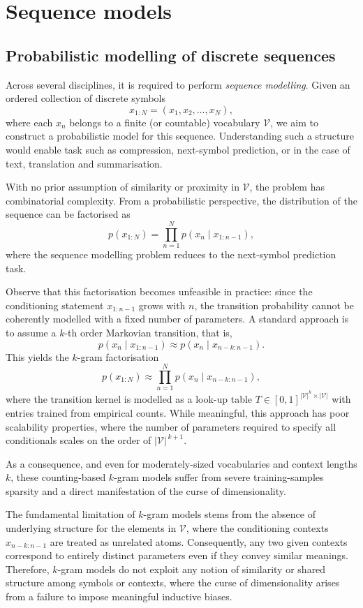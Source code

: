 \chapter{Sequence models}



\section{Probabilistic modelling of discrete sequences}
Across several disciplines, it is required to perform \emph{sequence modelling}. Given an ordered collection of discrete symbols
\[
x_{1:N} = (x_1, x_2, \dots, x_N),
\]
where each $x_n$ belongs to a finite (or countable) vocabulary $\mathcal{V}$, we aim to construct a probabilistic model for this sequence. Understanding such a structure would enable task such as compression, next-symbol prediction, or in the case of text, translation and summarisation. 

With no prior assumption of similarity or proximity in  $\mathcal{V}$, the problem has combinatorial complexity. From a probabilistic perspective, the distribution of the sequence can be factorised as
\[
p(x_{1:N}) = \prod_{n=1}^{N} p(x_n \mid x_{1:n-1}),
\]
where the sequence modelling problem reduces to the next-symbol prediction task.

Observe that this factorisation becomes unfeasible in practice: since the conditioning statement $x_{1:n-1}$ grows with $n$, the transition probability cannot be coherently modelled with a fixed number of parameters. A standard approach is to assume a $k$-th order Markovian transition, that is,
\[
p(x_n \mid x_{1:n-1}) \approx p(x_n \mid x_{n-k:n-1}).
\]
This yields the $k$-gram factorisation
\[
p(x_{1:N}) \approx \prod_{n=1}^{N} p(x_n \mid x_{n-k:n-1}),
\]
where the transition kernel is modelled as a look-up table $T\in[0,1]^{|\mathcal{V}|^k\times |\mathcal{V}|}$ with entries trained from empirical counts. While meaningful, this approach has poor scalability properties, where the number of parameters required to specify all conditionals scales on the order of $ |\mathcal{V}|^{\,k+1}$.

As a consequence, and even for moderately-sized  vocabularies and context lengths $k$, these counting-based $k$-gram models suffer from severe training-samples sparsity and a direct manifestation of the curse of dimensionality.


\begin{remark}
The fundamental limitation of $k$-gram models stems from  the absence of underlying structure for the elements in $\mathcal{V}$, where the conditioning contexts $x_{n-k:n-1}$ are treated as unrelated atoms. Consequently, any two given contexts correspond to entirely distinct parameters even if they convey similar meanings. Therefore,  $k$-gram models do not exploit any notion of similarity or shared structure among symbols or contexts, where the curse of dimensionality arises from a failure to impose meaningful inductive biases.
\end{remark}

